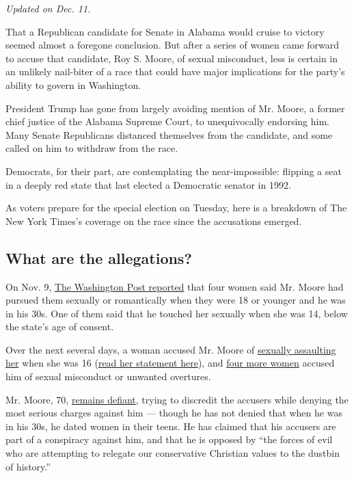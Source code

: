 \emph{Updated on Dec. 11.}

That a Republican candidate for Senate in Alabama would cruise to
victory seemed almost a foregone conclusion. But after a series of women
came forward to accuse that candidate, Roy S. Moore, of sexual
misconduct, less is certain in an unlikely nail-biter of a race that
could have major implications for the party's ability to govern in
Washington.

President Trump has gone from largely avoiding mention of Mr. Moore, a
former chief justice of the Alabama Supreme Court, to unequivocally
endorsing him. Many Senate Republicans distanced themselves from the
candidate, and some called on him to withdraw from the race.

Democrats, for their part, are contemplating the near-impossible:
flipping a seat in a deeply red state that last elected a Democratic
senator in 1992.

As voters prepare for the special election on Tuesday, here is a
breakdown of The New York Times's coverage on the race since the
accusations emerged.

\hypertarget{what-are-the-allegations}{%
\subsection{What are the allegations?}\label{what-are-the-allegations}}

On Nov. 9,
\href{https://www.washingtonpost.com/investigations/woman-says-roy-moore-initiated-sexual-encounter-when-she-was-14-he-was-32/2017/11/09/1f495878-c293-11e7-afe9-4f60b5a6c4a0_story.html?utm_term=.c2d840a6fc79}{The
Washington Post reported} that four women said Mr. Moore had pursued
them sexually or romantically when they were 18 or younger and he was in
his 30s. One of them said that he touched her sexually when she was 14,
below the state's age of consent.

Over the next several days, a woman accused Mr. Moore of
\href{https://www.nytimes3xbfgragh.onion/2017/11/13/us/politics/roy-moore-alabama-senate.html}{sexually
assaulting her} when she was 16
(\href{https://www.nytimes3xbfgragh.onion/2017/11/13/us/politics/text-beverly-young-nelson-statement.html}{read
her statement here}), and
\href{https://www.nytimes3xbfgragh.onion/2017/11/15/us/roy-moore-alabama-republicans.html}{four
more women} accused him of sexual misconduct or unwanted overtures.

Mr. Moore, 70,
\href{https://www.nytimes3xbfgragh.onion/2017/11/11/us/roy-moore-alabama-senate.html}{remains
defiant}, trying to discredit the accusers while denying the most
serious charges against him --- though he has not denied that when he
was in his 30s, he dated women in their teens. He has claimed that his
accusers are part of a conspiracy against him, and that he is opposed by
``the forces of evil who are attempting to relegate our conservative
Christian values to the dustbin of history.''

